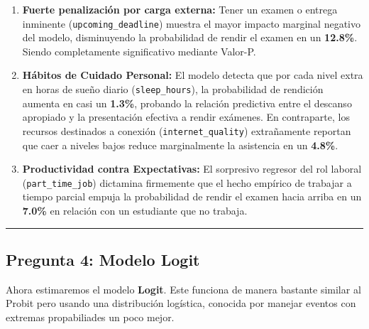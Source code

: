 \documentclass[11pt]{article}
\providecommand{\tightlist}{%
      \setlength{\itemsep}{0pt}\setlength{\parskip}{0pt}}
\begin{document}
\begin{enumerate}
\def\labelenumi{\arabic{enumi}.}
\tightlist
\item
  \textbf{Fuerte penalización por carga externa:} Tener un examen o
  entrega inminente (\texttt{upcoming\_deadline}) muestra el mayor
  impacto marginal negativo del modelo, disminuyendo la probabilidad de
  rendir el examen en un \textbf{12.8\%}. Siendo completamente
  significativo mediante Valor-P.
\item
  \textbf{Hábitos de Cuidado Personal:} El modelo detecta que por cada
  nivel extra en horas de sueño diario (\texttt{sleep\_hours}), la
  probabilidad de rendición aumenta en casi un \textbf{1.3\%}, probando
  la relación predictiva entre el descanso apropiado y la presentación
  efectiva a rendir exámenes. En contraparte, los recursos destinados a
  conexión (\texttt{internet\_quality}) extrañamente reportan que caer a
  niveles bajos reduce marginalmente la asistencia en un \textbf{4.8\%}.
\item
  \textbf{Productividad contra Expectativas:} El sorpresivo regresor del
  rol laboral (\texttt{part\_time\_job}) dictamina firmemente que el
  hecho empírico de trabajar a tiempo parcial empuja la probabilidad de
  rendir el examen hacia arriba en un \textbf{7.0\%} en relación con un
  estudiante que no trabaja.
\end{enumerate}

    \begin{center}\rule{0.5\linewidth}{0.5pt}\end{center}

\subsection{Pregunta 4: Modelo Logit}\label{pregunta-4-modelo-logit}

Ahora estimaremos el modelo \textbf{Logit}. Este funciona de manera
bastante similar al Probit pero usando una distribución logística,
conocida por manejar eventos con extremas propabiliades un poco mejor.
\end{document}
